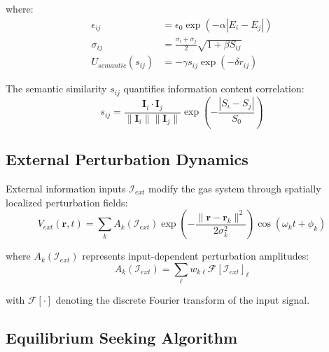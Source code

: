 \documentclass[11pt,a4paper]{article}
\begin{document}
where:
\begin{align}
\epsilon_{ij} &= \epsilon_0 \exp(-\alpha |E_i - E_j|) \label{eq:epsilon-modulation} \\
\sigma_{ij} &= \frac{\sigma_i + \sigma_j}{2} \sqrt{1 + \beta S_{ij}} \label{eq:sigma-modulation} \\
U_{semantic}(s_{ij}) &= -\gamma s_{ij} \exp(-\delta r_{ij})
\end{align}

The semantic similarity $s_{ij}$ quantifies information content correlation:
\begin{equation}
s_{ij} = \frac{\mathbf{I}_i \cdot \mathbf{I}_j}{\|\mathbf{I}_i\| \|\mathbf{I}_j\|} \exp\left(-\frac{|S_i - S_j|}{S_0}\right)
\label{eq:semantic-similarity}
\end{equation}

\subsection{External Perturbation Dynamics}

External information inputs $\mathcal{I}_{ext}$ modify the gas system through spatially localized perturbation fields:
\begin{equation}
V_{ext}(\mathbf{r}, t) = \sum_{k} A_k(\mathcal{I}_{ext}) \exp\left(-\frac{\|\mathbf{r} - \mathbf{r}_k\|^2}{2\sigma_k^2}\right) \cos(\omega_k t + \phi_k)
\label{eq:external-perturbation}
\end{equation}

where $A_k(\mathcal{I}_{ext})$ represents input-dependent perturbation amplitudes:
\begin{equation}
A_k(\mathcal{I}_{ext}) = \sum_{\ell} w_{k\ell} \mathcal{F}[\mathcal{I}_{ext}]_\ell
\label{eq:perturbation-amplitude}
\end{equation}

with $\mathcal{F}[\cdot]$ denoting the discrete Fourier transform of the input signal.

\subsection{Equilibrium Seeking Algorithm}
\end{document}
